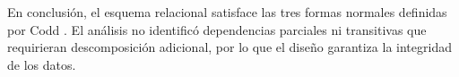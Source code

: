 En conclusión, el esquema relacional satisface las tres formas normales definidas por Codd \cite{codd1970}\cite{codd1971}. 
El análisis no identificó dependencias parciales ni transitivas que requirieran descomposición adicional, por lo que el diseño garantiza la integridad de los datos.













